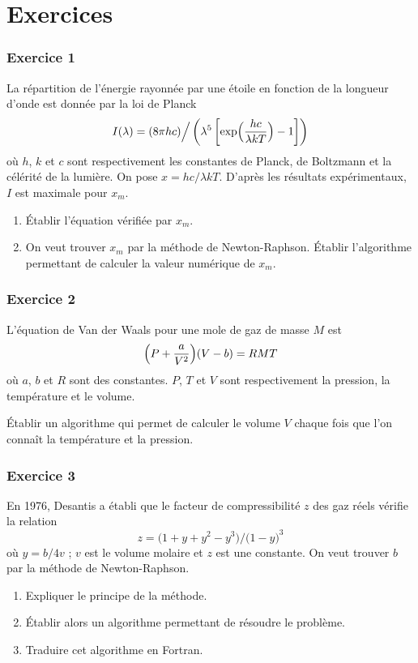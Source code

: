 \chapter*{Exercices}

\subsection*{Exercice 1}

La répartition de l'énergie rayonnée par une étoile en fonction de la
longueur d'onde est donnée par la loi de Planck
\[
  I(\lambda) = (8\pi hc)\Big/\left(\lambda^5\left[\exp\Bigl(\frac{hc}{\lambda kT}\Bigr) - 1\right]\right)
\]
où $h$, $k$ et $c$ sont respectivement les constantes de Planck, de Boltzmann
et la célérité de la lumière. On pose $x = hc/\lambda kT$. D'après les
résultats expérimentaux, $I$ est maximale pour $x_m$.
\begin{enumerate}[label=\arabic*-]
  \item Établir l'équation vérifiée par $x_m$.
  \item On veut trouver $x_m$ par la méthode de Newton-Raphson. Établir
        l'algorithme permettant de calculer la valeur numérique de $x_m$.
\end{enumerate}

\subsection*{Exercice 2}

L'équation de Van der Waals pour une mole de gaz de masse $M$ est
\[
  \Bigl(P + \frac{a}{V^2}\Bigr)(V - b) = RMT
\]
où $a$, $b$ et $R$ sont des constantes. $P$, $T$ et $V$ sont respectivement la
pression, la température et le volume.

Établir un algorithme qui permet de calculer le volume $V$ chaque fois que
l'on connaît la température et la pression.

\subsection*{Exercice 3}

En 1976, Desantis a établi que le facteur de compressibilité $z$ des gaz réels
vérifie la relation
\[
  z = \bigl(1 + y + y^2 - y^3\bigr)\big/\bigl(1 - y\bigr)^3
\]
où $y = b/4v$ ; $v$ est le volume molaire et $z$ est une constante. On veut
trouver $b$ par la méthode de Newton-Raphson.
\begin{enumerate}[label=\arabic*-]
  \item Expliquer le principe de la méthode.
  \item Établir alors un algorithme permettant de résoudre le problème.
  \item Traduire cet algorithme en Fortran.
\end{enumerate}

